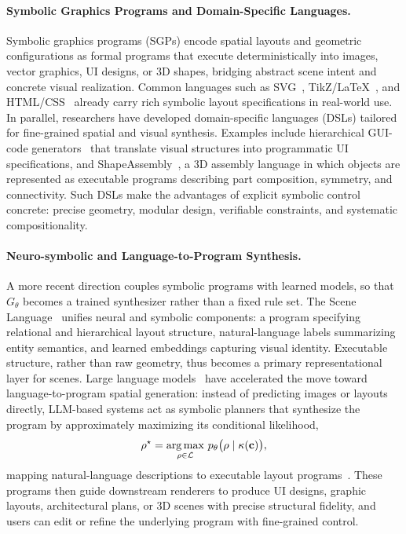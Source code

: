 \paragraph{Symbolic Graphics Programs and Domain-Specific Languages.}
Symbolic graphics programs (SGPs) encode spatial layouts and geometric configurations as formal programs that execute deterministically into images, vector graphics, UI designs, or 3D shapes, bridging abstract scene intent and concrete visual realization. Common languages such as SVG~\cite{bing2025learning}, TikZ/LaTeX~\cite{ellis2018learning}, and HTML/CSS~\cite{chen2025designcoder} already carry rich symbolic layout specifications in real-world use.
In parallel, researchers have developed domain-specific languages (DSLs) tailored for fine-grained spatial and visual synthesis.
Examples include hierarchical GUI-code generators~\cite{zhu2018automatic} that translate visual structures into programmatic UI specifications, and ShapeAssembly~\cite{jones2020shapeassembly}, a 3D assembly language in which objects are represented as executable programs describing part composition, symmetry, and connectivity.
Such DSLs make the advantages of explicit symbolic control concrete: precise geometry, modular design, verifiable constraints, and systematic compositionality.

\paragraph{Neuro-symbolic and Language-to-Program Synthesis.}
A more recent direction couples symbolic programs with learned models, so that $G_\theta$ becomes a trained synthesizer rather than a fixed rule set. The Scene Language~\cite{zhang2025scenelanguage} unifies neural and symbolic components: a program specifying relational and hierarchical layout structure, natural-language labels summarizing entity semantics, and learned embeddings capturing visual identity.
Executable structure, rather than raw geometry, thus becomes a primary representational layer for scenes.
Large language models~\cite{brown2020language,achiam2023gpt} have accelerated the move toward language-to-program spatial generation: instead of predicting images or layouts directly, LLM-based systems act as symbolic planners that synthesize the program by approximately maximizing its conditional likelihood,
\begin{equation}
\label{eq:p3_s8_7_synthesis}
\rho^{\star} = \operatorname*{arg\,max}_{\rho \in \mathcal{L}} \, p_\theta\big(\rho \mid \kappa(\mathbf{c})\big),
\end{equation}
mapping natural-language descriptions to executable layout programs~\cite{aguina2024open, hsu2025programs, yang2024holodeck}.
These programs then guide downstream renderers to produce UI designs, graphic layouts, architectural plans, or 3D scenes with precise structural fidelity, and users can edit or refine the underlying program with fine-grained control.

